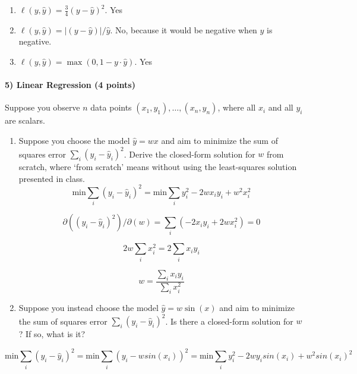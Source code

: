 \documentclass[11pt]{article}
\begin{document}
	\begin{enumerate}
		\item $\ell (y, \hat{y}) = \frac{3}{4} (y-\hat{y})^2$. Yes
		\item $\ell (y, \hat{y}) = |(y-\hat{y})|/\hat{y}$. No, because it would be negative when $\hat{y}$ is negative.
		\item $\ell (y, \hat{y}) = \max(0, 1 - y \cdot \hat{y})$. Yes
	\end{enumerate}
	
	\paragraph{5) Linear Regression (4 points)} Suppose you observe $n$ data points $(x_1, y_1), \ldots, (x_n, y_n)$, where all $x_i$ and all $y_i$ are scalars.
	\begin{enumerate}
		\item Suppose you choose the model $\hat{y} = w x$ and aim to minimize the sum of squares error $\sum_i (y_i - \hat{y}_i)^2$. Derive the closed-form solution for $w$ from scratch, where `from scratch' means without using the least-squares solution presented in class.
		\begin{equation*}
		\text{min} \sum_i (y_i - \hat{y}_i) ^2
		= \text{min} \sum_i y_i^2 - 2 w x_i y_i + w^2 x_i^2
		\end{equation*}
		
		\begin{equation*}
		\partial{((y_i - \hat{y}_i) ^2)}/\partial(w)
		= \sum_i (-2 x_i y_i + 2 w x_i^2) = 0
		\end{equation*}
		
		\begin{equation*}
		2 w \sum_i x_i^2 = 2 \sum_i x_i y_i
		\end{equation*}
		
		\begin{equation*}
		w = \frac{\sum_i x_i y_i } { \sum_i x_i^2}
		\end{equation*}
		
		\item Suppose you instead choose the model $\hat{y} = w \sin(x)$ and aim to minimize the sum of squares error $\sum_i (y_i - \hat{y}_i)^2$. Is there a closed-form solution for $w$? If so, what is it?
	\end{enumerate}
		
		\begin{equation*}
		\text{min} \sum_i (y_i - \hat{y}_i) ^2
		= \text{min} \sum_i (y_i - w sin(x_i))^2
		= \text{min} \sum_i y_i^2 - 2 w y_i sin(x_i) + w^2 sin(x_i)^2
		\end{equation*}
		
\end{document}
